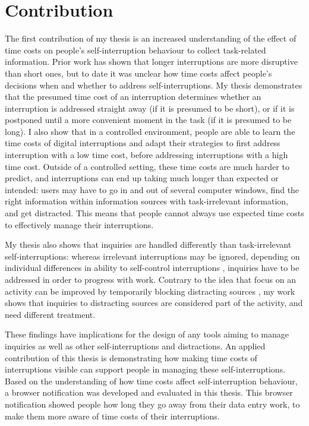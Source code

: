 \section{Contribution}
The first contribution of my thesis is an increased understanding of the effect of time costs on people's self-interruption behaviour to collect task-related information. Prior work has shown that longer interruptions are more disruptive than short ones, but to date it was unclear how time costs affect people's decisions when and whether to address self-interruptions. My thesis demonstrates that the presumed time cost of an interruption determines whether an interruption is addressed straight away (if it is presumed to be short), or if it is postponed until a more convenient moment in the task (if it is presumed to be long). I also show that in a controlled environment, people are able to learn the time costs of digital interruptions and adapt their strategies to first address interruption with a low time cost, before addressing interruptions with a high time cost. Outside of a controlled setting, these time costs are much harder to predict, and interruptions can end up taking much longer than expected or intended: users may have to go in and out of several computer windows, find the right information within information sources with task-irrelevant information, and get distracted. This means that people cannot always use expected time costs to effectively manage their interruptions. 

My thesis also shows that inquiries are handled differently than task-irrelevant self-interruptions: whereas irrelevant interruptions may be ignored, depending on individual differences in ability to self-control interruptions \citep{Lyngs2018}, inquiries have to be addressed in order to progress with work. Contrary to the idea that focus on an activity can be improved by temporarily blocking distracting sources \citep{Kim2017}, my work shows that inquiries to distracting sources are considered part of the activity, and need different treatment. 

These findings have implications for the design of any tools aiming to manage inquiries as well as other self-interruptions and distractions. An applied contribution of this thesis is demonstrating how making time costs of interruptions visible can support people in managing these self-interruptions. Based on the understanding of how time costs affect self-interruption behaviour, a browser notification was developed and evaluated in this thesis. This browser notification showed people how long they go away from their data entry work, to make them more aware of time costs of their interruptions. %

